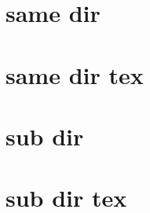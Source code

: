 \documentclass[11pt]{article}
\begin{document}
    \section{same dir}
    
    \section{same dir tex}
    
    \section{sub dir}
    
    \section{sub dir tex}
    
\end{document}
